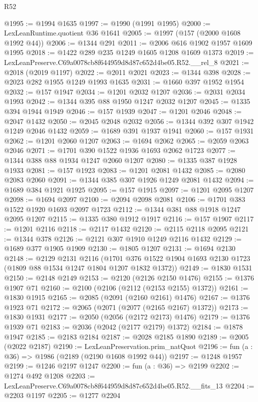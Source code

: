 \begin{lexlean}{R52}
\begin{coremodule}
@1995 := @1994 @1635
@1997 := @1990 (@1991 @1995)
@2000 := LexLeanRuntime.quotient @36 @1641
@2005 := @1997 (@157 (@2000 @1608 @1992 @44))
@2006 := @1344 @291
@2011 := @2006 @616 @1902 @1957 @1609 @1995
@2018 := @1422 @289 @235 @1249 @1605 @1208 @1609 @1373
@2019 := LexLeanPreserve.C69a0078cb8f644959d8d87c652d4be05.R52.__rel_8
@2021 := @2018 (@2019 @1197)
@2022 := @2011 @2021
@2023 := @1344 @398
@2028 := @2023 @282 @1955 @1249 @1993 @1635
@2031 := @1660 @397 @1952 @1954
@2032 := @157 @1947
@2034 := @1201 @2032 @1207
@2036 := @2031 @2034 @1993
@2042 := @1344 @395 @88 @1950 @1247 @2032 @1207
@2045 := @1335 @394 @1944 @1949
@2046 := @157 @1939
@2047 := @1201 @2046
@2048 := @2047 @1432
@2050 := @2045 @2048 @2032
@2056 := @1344 @392 @307 @1942 @1249 @2046 @1432
@2059 := @1689 @391 @1937 @1941
@2060 := @157 @1931
@2062 := @1201 @2060 @1207
@2063 := @1694 @2062
@2065 := @2059 @2063 @2046
@2071 := @1701 @390 @1522 @1936 @1693 @2062 @1723
@2077 := @1344 @388 @88 @1934 @1247 @2060 @1207
@2080 := @1335 @387 @1928 @1933
@2081 := @157 @1923
@2083 := @1201 @2081 @1432
@2085 := @2080 @2083 @2060
@2091 := @1344 @385 @307 @1926 @1249 @2081 @1432
@2094 := @1689 @384 @1921 @1925
@2095 := @157 @1915
@2097 := @1201 @2095 @1207
@2098 := @1694 @2097
@2100 := @2094 @2098 @2081
@2106 := @1701 @383 @1522 @1920 @1693 @2097 @1723
@2112 := @1344 @381 @88 @1918 @1247 @2095 @1207
@2115 := @1335 @380 @1912 @1917
@2116 := @157 @1907
@2117 := @1201 @2116
@2118 := @2117 @1432
@2120 := @2115 @2118 @2095
@2121 := @1344 @378
@2126 := @2121 @307 @1910 @1249 @2116 @1432
@2129 := @1689 @377 @1905 @1909
@2130 := @1805 @1207
@2131 := @1694 @2130
@2148 := @2129
    @2131
    @2116
    (@1701 @376 @1522 @1904 @1693 @2130 @1723 (@1809 @88 @1534 @1247 @1804 @1207 @1832 @1372))
@2149 := @1830 @1531
@2150 := @2148 @2149
@2153 := @2120 (@2126 @2150 @1476)
@2155 := @1376 @1907 @71
@2160 := @2100 (@2106 (@2112 (@2153 @2155) @1372))
@2161 := @1830 @1915
@2165 := @2085 (@2091 (@2160 @2161) @1476)
@2167 := @1376 @1923 @71
@2172 := @2065 (@2071 (@2077 (@2165 @2167) @1372))
@2173 := @1830 @1931
@2177 := @2050 (@2056 (@2172 @2173) @1476)
@2179 := @1376 @1939 @71
@2183 := @2036 (@2042 (@2177 @2179) @1372)
@2184 := @1878 @1947
@2185 := @2183 @2184
@2187 := @2028 @2185 @1890
@2189 := @2005 (@2022 @2187)
@2190 := LexLeanPreservation.prim_natQuot
@2196 := fun (a : @36) => @1986 (@2189 (@2190 @1608 @1992 @44))
@2197 := @1248 @1957
@2199 := @1246 @2197 @1247
@2200 := fun (a : @36) => @2199
@2202 := @1274 @492 @1208
@2203 := LexLeanPreserve.C69a0078cb8f644959d8d87c652d4be05.R52.__fits_13
@2204 := @2203 @1197
@2205 := @1277 @2204

\end{coremodule}
\end{lexlean}
